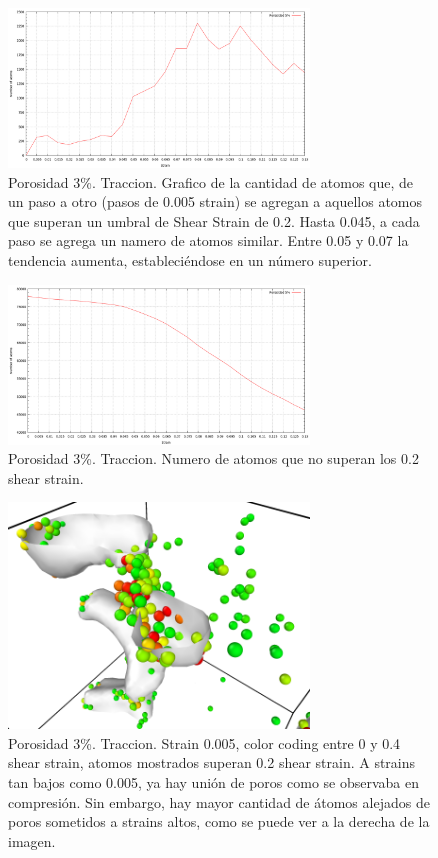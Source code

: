 \documentclass[10pt, oneside]{article} %
\begin{document}
\begin{figure}[H]
\centering
\includegraphics[width=8cm]{Figures/porosidad_trac_umbral.png}
\caption{Porosidad 3\%. Traccion. Grafico de la cantidad de atomos que, de un paso a otro (pasos de 0.005 strain) se agregan a aquellos atomos que superan un umbral de Shear Strain de 0.2. Hasta 0.045, a cada paso se agrega un namero de atomos similar. Entre 0.05 y 0.07 la tendencia aumenta, estableciéndose en un número superior.}
\end{figure}

\begin{figure}[H]
\centering
\includegraphics[width=8cm]{Figures/porosidad_trac_umbral2.png}
\caption{Porosidad 3\%. Traccion. Numero de atomos que no superan los 0.2 shear strain.}
\end{figure}

\begin{figure}[H]
\centering
\includegraphics[width=8cm]{Figures/porosidad_3_strain0005_color_0_04.png}
\caption{Porosidad 3\%. Traccion. Strain 0.005, color coding entre 0 y 0.4 shear strain, atomos mostrados superan 0.2 shear strain. A strains tan bajos como 0.005, ya hay unión de poros como se observaba en compresión. Sin embargo, hay mayor cantidad de átomos alejados de poros sometidos a strains altos, como se puede ver a la derecha de la imagen.}
\end{figure}
\end{document}
